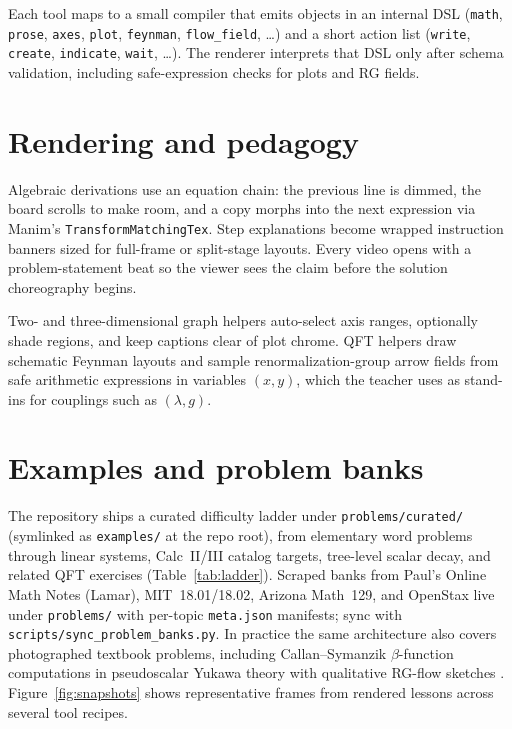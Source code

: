 \documentclass[11pt]{article}
\begin{document}
Each tool maps to a small compiler that emits objects in an internal DSL
(\texttt{math}, \texttt{prose}, \texttt{axes}, \texttt{plot}, \texttt{feynman},
\texttt{flow\_field}, \ldots) and a short action list
(\texttt{write}, \texttt{create}, \texttt{indicate}, \texttt{wait}, \ldots).
The renderer interprets that DSL only after schema validation, including
safe-expression checks for plots and RG fields.

\section{Rendering and pedagogy}

Algebraic derivations use an equation chain: the previous line is dimmed,
the board scrolls to make room, and a copy morphs into the next expression
via Manim's \texttt{TransformMatchingTex}. Step explanations become wrapped
instruction banners sized for full-frame or split-stage layouts. Every video
opens with a problem-statement beat so the viewer sees the claim before the
solution choreography begins.

Two- and three-dimensional graph helpers auto-select axis ranges, optionally
shade regions, and keep captions clear of plot chrome. QFT helpers draw
schematic Feynman layouts and sample renormalization-group arrow fields from
safe arithmetic expressions in variables $(x,y)$, which the teacher uses as
stand-ins for couplings such as $(\lambda,g)$.

\section{Examples and problem banks}

The repository ships a curated difficulty ladder under
\texttt{problems/curated/} (symlinked as \texttt{examples/} at the repo root),
from elementary word problems through linear systems, Calc~II/III catalog
targets, tree-level scalar decay, and related QFT exercises
(Table~\ref{tab:ladder}). Scraped banks from Paul's Online Math Notes (Lamar),
MIT~18.01/18.02, Arizona Math~129, and OpenStax live under \texttt{problems/}
with per-topic \texttt{meta.json} manifests; sync with
\texttt{scripts/sync\_problem\_banks.py}. In practice the same architecture
also covers photographed textbook problems, including Callan--Symanzik
$\beta$-function computations in pseudoscalar Yukawa theory with qualitative
RG-flow sketches \citep{peskin1995introduction}.
Figure~\ref{fig:snapshots} shows representative frames from rendered lessons
across several tool recipes.
\end{document}
